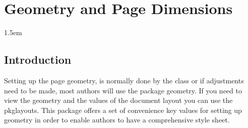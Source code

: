 %
%
\chapter{Geometry and Page Dimensions}
\parindent1.5em

\section{Introduction}

Setting up the page geometry, is normally done by the class or if adjustments need to be made, most authors will use the package geometry. If you need to view the geometry and the values of the document layout you can use the pkg{layouts}. This package offers a set of convenience key values for setting up geometry in order to enable authors to have a comprehensive style sheet.

